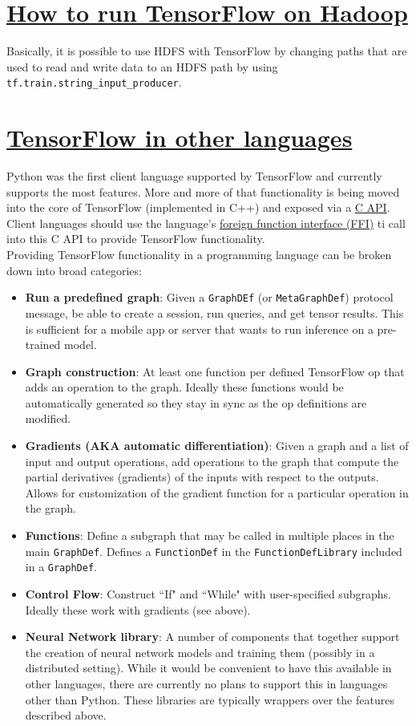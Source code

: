 \documentclass[11pt,a4paper]{article}
\begin{document}
  \section{\href{www.tensorflow.org/versions/r0.11/how_tos/hadoop/index.html}{How to run TensorFlow on Hadoop}}
  Basically, it is possible to use HDFS with TensorFlow by changing paths that are used to read and write data to an HDFS path by using \texttt{tf.train.string\_input\_producer}. 
  
  \section{\href{www.tensorflow.org/versions/r0.11/how_tos/language_bindings/index.html}{TensorFlow in other languages}}
  Python was the first client language supported by TensorFlow and currently supports the most features. More and more of that functionality is being moved into the core of TensorFlow (implemented in C++) and exposed via a \href{https://www.tensorflow.org/code/tensorflow/c/c_api.h}{C API}. Client languages should use the language's \href{https://en.wikipedia.org/wiki/Foreign_function_interface}{foreign function interface (FFI)} ti call into this C API to provide TensorFlow functionality. \\ 
  Providing TensorFlow functionality in a programming language can be broken down into broad categories: 
  \begin{itemize}
  	\item \textbf{Run a predefined graph}: Given a \texttt{GraphDEf} (or \texttt{MetaGraphDef}) protocol message, be able to create a session, run queries, and get tensor results. This is sufficient for a mobile app or server that wants to run inference on a pre-trained model. 
  	\item \textbf{Graph construction}: At least one function per defined TensorFlow op that adds an operation to the graph. Ideally these functions would be automatically generated so they stay in sync as the op definitions are modified.
  	\item \textbf{Gradients (AKA automatic differentiation)}: Given a graph and a list of input and output operations, add operations to the graph that compute the partial derivatives (gradients) of the inputs with respect to the outputs. Allows for customization of the gradient function for a particular operation in the graph.  
  	\item \textbf{Functions}: Define a subgraph that may be called in multiple places in the main \texttt{GraphDef}. Defines a \texttt{FunctionDef} in the \texttt{FunctionDefLibrary} included in a \texttt{GraphDef}.
  	\item \textbf{Control Flow}: Construct ``If" and ``While" with user-specified subgraphs. Ideally these work with gradients (see above).
  	\item \textbf{Neural Network library}: A number of components that together support the creation of neural network models and training them (possibly in a distributed setting). While it would be convenient to have this available in other languages, there are currently no plans to support this in languages other than Python. These libraries are typically wrappers over the features described above.
  \end{itemize}
\end{document}

